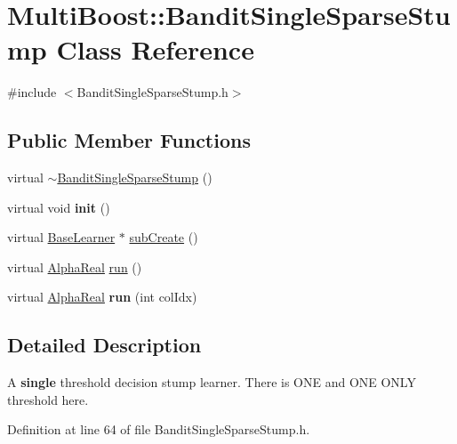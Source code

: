 \hypertarget{classMultiBoost_1_1BanditSingleSparseStump}{
\section{MultiBoost::BanditSingleSparseStump Class Reference}
\label{classMultiBoost_1_1BanditSingleSparseStump}
}


{\ttfamily \#include $<$BanditSingleSparseStump.h$>$}

\subsection*{Public Member Functions}
\begin{DoxyCompactItemize}
\item 
virtual \hyperlink{classMultiBoost_1_1BanditSingleSparseStump_ae74b6227442d0635827a08ac0501d5b0}{$\sim$BanditSingleSparseStump} ()
\item 
\hypertarget{classMultiBoost_1_1BanditSingleSparseStump_af7ea75c329631d8ff52e3ed30f8ef39f}{
virtual void {\bfseries init} ()}
\label{classMultiBoost_1_1BanditSingleSparseStump_af7ea75c329631d8ff52e3ed30f8ef39f}

\item 
virtual \hyperlink{classMultiBoost_1_1BaseLearner}{BaseLearner} $\ast$ \hyperlink{classMultiBoost_1_1BanditSingleSparseStump_af95646629bcf05b0df1365bff363e3f0}{subCreate} ()
\item 
virtual \hyperlink{Defaults_8h_a80184c4fd10ab70a1a17c5f97dcd1563}{AlphaReal} \hyperlink{classMultiBoost_1_1BanditSingleSparseStump_ac0df8170a157a48d795722624f7772c3}{run} ()
\item 
\hypertarget{classMultiBoost_1_1BanditSingleSparseStump_ab8e8082c6f32c18358ca1ce2f4d4e462}{
virtual \hyperlink{Defaults_8h_a80184c4fd10ab70a1a17c5f97dcd1563}{AlphaReal} {\bfseries run} (int colIdx)}
\label{classMultiBoost_1_1BanditSingleSparseStump_ab8e8082c6f32c18358ca1ce2f4d4e462}

\end{DoxyCompactItemize}


\subsection{Detailed Description}
A {\bfseries single} threshold decision stump learner. There is ONE and ONE ONLY threshold here. 

Definition at line 64 of file BanditSingleSparseStump.h.



